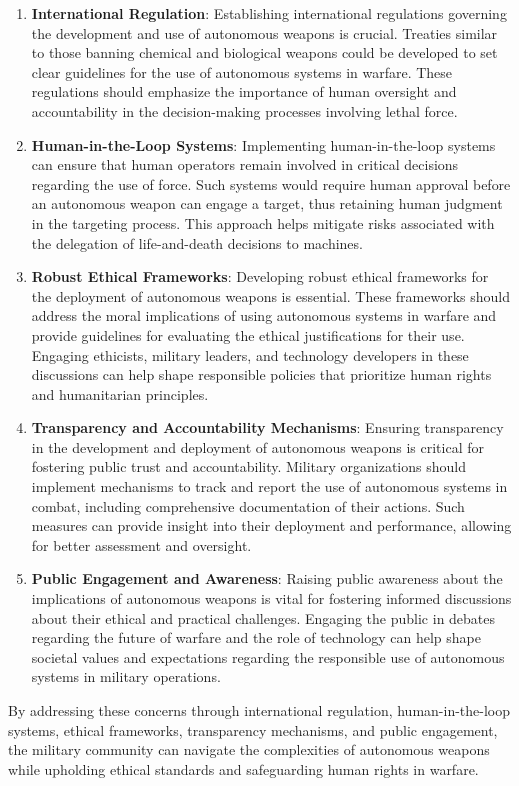 \begin{enumerate}
    \item \textbf{International Regulation}: Establishing international regulations governing the development and use of autonomous weapons is crucial. Treaties similar to those banning chemical and biological weapons could be developed to set clear guidelines for the use of autonomous systems in warfare. These regulations should emphasize the importance of human oversight and accountability in the decision-making processes involving lethal force.

    \item \textbf{Human-in-the-Loop Systems}: Implementing human-in-the-loop systems can ensure that human operators remain involved in critical decisions regarding the use of force. Such systems would require human approval before an autonomous weapon can engage a target, thus retaining human judgment in the targeting process. This approach helps mitigate risks associated with the delegation of life-and-death decisions to machines.

    \item \textbf{Robust Ethical Frameworks}: Developing robust ethical frameworks for the deployment of autonomous weapons is essential. These frameworks should address the moral implications of using autonomous systems in warfare and provide guidelines for evaluating the ethical justifications for their use. Engaging ethicists, military leaders, and technology developers in these discussions can help shape responsible policies that prioritize human rights and humanitarian principles.

    \item \textbf{Transparency and Accountability Mechanisms}: Ensuring transparency in the development and deployment of autonomous weapons is critical for fostering public trust and accountability. Military organizations should implement mechanisms to track and report the use of autonomous systems in combat, including comprehensive documentation of their actions. Such measures can provide insight into their deployment and performance, allowing for better assessment and oversight.

    \item \textbf{Public Engagement and Awareness}: Raising public awareness about the implications of autonomous weapons is vital for fostering informed discussions about their ethical and practical challenges. Engaging the public in debates regarding the future of warfare and the role of technology can help shape societal values and expectations regarding the responsible use of autonomous systems in military operations.
\end{enumerate}

By addressing these concerns through international regulation, human-in-the-loop systems, ethical frameworks, transparency mechanisms, and public engagement, the military community can navigate the complexities of autonomous weapons while upholding ethical standards and safeguarding human rights in warfare.\cite{KILLINGER2020,ASARO2018,SHARIF202061}
